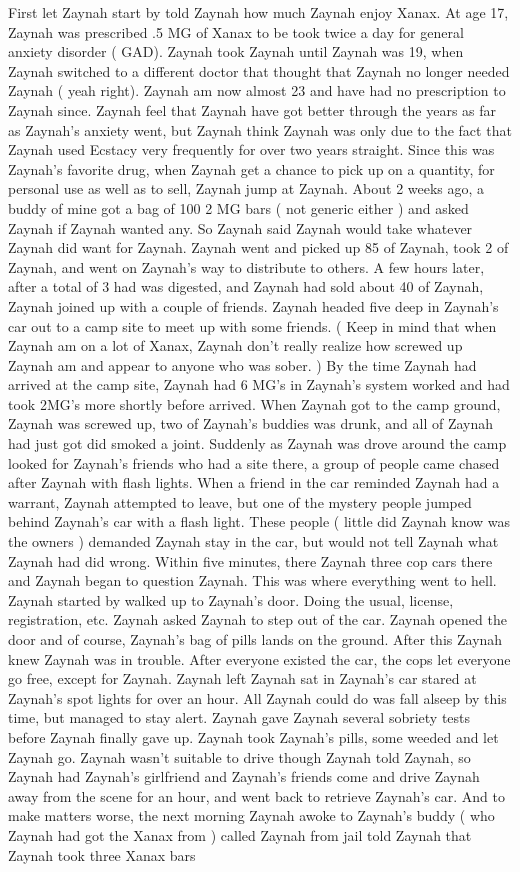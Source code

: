 \documentclass[12pt]{book}
\begin{document}
First let Zaynah start by told Zaynah how much Zaynah enjoy Xanax. At age 17, Zaynah was prescribed .5 MG of Xanax to be took twice a day for general anxiety disorder ( GAD). Zaynah took Zaynah until Zaynah was 19, when Zaynah switched to a different doctor that thought that Zaynah no longer needed Zaynah ( yeah right). Zaynah am now almost 23 and have had no prescription to Zaynah since. Zaynah feel that Zaynah have got better through the years as far as Zaynah's anxiety went, but Zaynah think Zaynah was only due to the fact that Zaynah used Ecstacy very frequently for over two years straight. Since this was Zaynah's favorite drug, when Zaynah get a chance to pick up on a quantity, for personal use as well as to sell, Zaynah jump at Zaynah. About 2 weeks ago, a buddy of mine got a bag of 100 2 MG bars ( not generic either ) and asked Zaynah if Zaynah wanted any. So Zaynah said Zaynah would take whatever Zaynah did want for Zaynah. Zaynah went and picked up 85 of Zaynah, took 2 of Zaynah, and went on Zaynah's way to distribute to others. A few hours later, after a total of 3 had was digested, and Zaynah had sold about 40 of Zaynah, Zaynah joined up with a couple of friends. Zaynah headed five deep in Zaynah's car out to a camp site to meet up with some friends. ( Keep in mind that when Zaynah am on a lot of Xanax, Zaynah don't really realize how screwed up Zaynah am and appear to anyone who was sober. ) By the time Zaynah had arrived at the camp site, Zaynah had 6 MG's in Zaynah's system worked and had took 2MG's more shortly before arrived. When Zaynah got to the camp ground, Zaynah was screwed up, two of Zaynah's buddies was drunk, and all of Zaynah had just got did smoked a joint. Suddenly as Zaynah was drove around the camp looked for Zaynah's friends who had a site there, a group of people came chased after Zaynah with flash lights. When a friend in the car reminded Zaynah had a warrant, Zaynah attempted to leave, but one of the mystery people jumped behind Zaynah's car with a flash light. These people ( little did Zaynah know was the owners ) demanded Zaynah stay in the car, but would not tell Zaynah what Zaynah had did wrong. Within five minutes, there Zaynah three cop cars there and Zaynah began to question Zaynah. This was where everything went to hell. Zaynah started by walked up to Zaynah's door. Doing the usual, license, registration, etc. Zaynah asked Zaynah to step out of the car. Zaynah opened the door and of course, Zaynah's bag of pills lands on the ground. After this Zaynah knew Zaynah was in trouble. After everyone existed the car, the cops let everyone go free, except for Zaynah. Zaynah left Zaynah sat in Zaynah's car stared at Zaynah's spot lights for over an hour. All Zaynah could do was fall alseep by this time, but managed to stay alert. Zaynah gave Zaynah several sobriety tests before Zaynah finally gave up. Zaynah took Zaynah's pills, some weeded and let Zaynah go. Zaynah wasn't suitable to drive though Zaynah told Zaynah, so Zaynah had Zaynah's girlfriend and Zaynah's friends come and drive Zaynah away from the scene for an hour, and went back to retrieve Zaynah's car. And to make matters worse, the next morning Zaynah awoke to Zaynah's buddy ( who Zaynah had got the Xanax from ) called Zaynah from jail told Zaynah that Zaynah took three Xanax bars 
\end{document}
